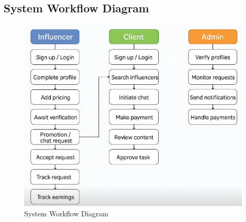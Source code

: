 \begin{justify}
\section{System Workflow Diagram}
\begin{figure}[H]
    \centering
    \includegraphics[height=0.5\textheight]{Chapters/Screenshot 2025-05-14 102150.png}
    \caption{System Workflow Diagram}
    \label{fig:system-workflow}
\end{figure}
  \end{justify}




